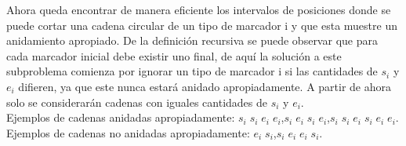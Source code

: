 \documentclass{report}
\begin{document}
Ahora queda encontrar de manera eficiente los intervalos de posiciones donde se puede cortar una cadena circular de un tipo de marcador i y que esta muestre un anidamiento apropiado. 	
De la definici\'on recursiva se puede observar que para cada marcador inicial debe existir uno final, de aqu\'i la soluci\'on a este subproblema comienza por ignorar un tipo de marcador i si las cantidades de $s_i$ y $e_i$ difieren, ya que este nunca estar\'a anidado apropiadamente. A partir de ahora solo se considerar\'an cadenas con iguales cantidades de $s_i$ y $e_i$.\\
Ejemplos de cadenas anidadas apropiadamente: $s_i \; s_i \; e_i \; e_i $,\hspace{1cm}$s_i \; e_i \; s_i \; e_i$,\hspace{1cm}$s_i \; s_i \; e_i \; s_i \; e_i \; e_i$.\\
Ejemplos de cadenas no anidadas apropiadamente: $e_i \; s_i $,\hspace{1cm}$s_i \; e_i \; e_i \; s_i$.\\
\end{document}
